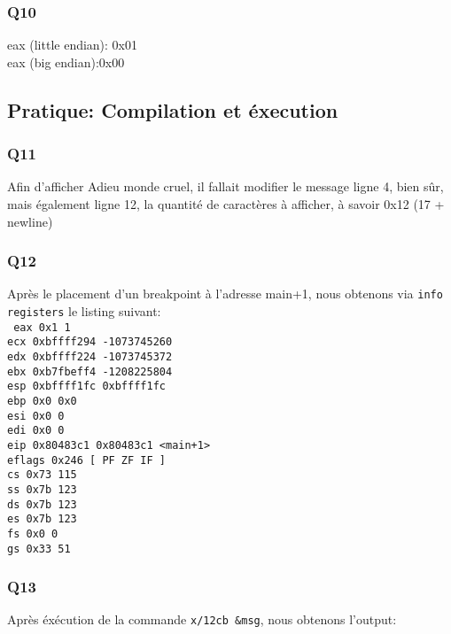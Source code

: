 \documentclass[12pt,a4paper,oneside]{article}
\begin{document}
\subsubsection{Q10}
eax (little endian): 0x01\\
eax (big endian):0x00

\subsection{Pratique: Compilation et éxecution}
\subsubsection{Q11}
Afin d'afficher Adieu monde cruel, il fallait modifier le message ligne 4, bien sûr, mais également ligne 12, la quantité de caractères à afficher, à savoir 0x12 (17 + newline)



\subsubsection{Q12}
Après le placement d'un breakpoint à l'adresse main+1, nous obtenons via \texttt{info registers} le listing suivant:\\
\texttt{
eax            0x1  1\\
ecx            0xbffff294   -1073745260\\
edx            0xbffff224   -1073745372\\
ebx            0xb7fbeff4   -1208225804\\
esp            0xbffff1fc   0xbffff1fc\\
ebp            0x0  0x0\\
esi            0x0  0\\
edi            0x0  0\\
eip            0x80483c1    0x80483c1 <main+1>\\
eflags         0x246    [ PF ZF IF ]\\
cs             0x73 115\\
ss             0x7b 123\\
ds             0x7b 123\\
es             0x7b 123\\
fs             0x0  0\\
gs             0x33 51\\
}

\subsubsection{Q13}
Après éxécution de la commande \texttt{x/12cb \&msg}, nous obtenons l'output:
\end{document}
